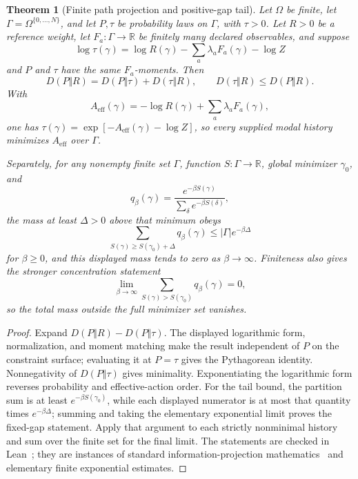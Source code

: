 \documentclass[11pt]{article}
\newcounter{none}
\newtheorem{theorem}{Theorem}[section]
\begin{document}
\begin{theorem}[Finite path projection and positive-gap tail]
\label{thm:finite-path-projection}
Let \(\Omega\) be finite, let
\(\Gamma=\Omega^{\{0,\ldots,N\}}\), and let \(P,\tau\) be probability laws on
\(\Gamma\), with \(\tau>0\).  Let \(R>0\) be a reference weight, let
\(F_a:\Gamma\to\mathbb R\) be finitely many declared observables, and suppose
\[
 \log\tau(\gamma)
 =\log R(\gamma)-\sum_a\lambda_aF_a(\gamma)-\log Z
\]
and \(P\) and \(\tau\) have the same \(F_a\)-moments.  Then
\[
 D(P\Vert R)=D(P\Vert\tau)+D(\tau\Vert R),
 \qquad
 D(\tau\Vert R)\le D(P\Vert R).
\]
With
\[
 A_{\mathrm{eff}}(\gamma)
 =-\log R(\gamma)+\sum_a\lambda_aF_a(\gamma),
\]
one has \(\tau(\gamma)=\exp[-A_{\mathrm{eff}}(\gamma)-\log Z]\), so every
supplied modal history minimizes \(A_{\mathrm{eff}}\) over \(\Gamma\).

Separately, for any nonempty finite set \(\Gamma\), function
\(S:\Gamma\to\mathbb R\), global minimizer \(\gamma_0\), and
\[
 q_\beta(\gamma)=
 \frac{e^{-\beta S(\gamma)}}{\sum_\delta e^{-\beta S(\delta)}},
\]
the mass at least \(\Delta>0\) above that minimum obeys
\[
 \sum_{S(\gamma)\ge S(\gamma_0)+\Delta}q_\beta(\gamma)
 \le |\Gamma|e^{-\beta\Delta}
\]
for \(\beta\ge0\), and this displayed mass tends to zero as
\(\beta\to\infty\).  Finiteness also gives the stronger concentration
statement
\[
 \lim_{\beta\to\infty}
 \sum_{S(\gamma)>S(\gamma_0)}q_\beta(\gamma)=0,
\]
so the total mass outside the full minimizer set vanishes.
\end{theorem}

\begin{proof}
Expand \(D(P\Vert R)-D(P\Vert\tau)\).  The displayed logarithmic form,
normalization, and moment matching make the result independent of \(P\) on
the constraint surface; evaluating it at \(P=\tau\) gives the Pythagorean
identity.  Nonnegativity of \(D(P\Vert\tau)\) gives minimality.  Exponentiating
the logarithmic form reverses probability and effective-action order.  For
the tail bound, the partition sum is at least
\(e^{-\beta S(\gamma_0)}\), while each displayed numerator is at most that
quantity times \(e^{-\beta\Delta}\); summing and taking the elementary
exponential limit proves the fixed-gap statement.  Apply that argument to
each strictly nonminimal history and sum over the finite set for the final
limit.  The statements are checked in Lean~\cite{ophrepo}; they are instances
of standard information-projection mathematics~\cite{csiszar1975} and
elementary finite exponential estimates.
\end{proof}
\end{document}
